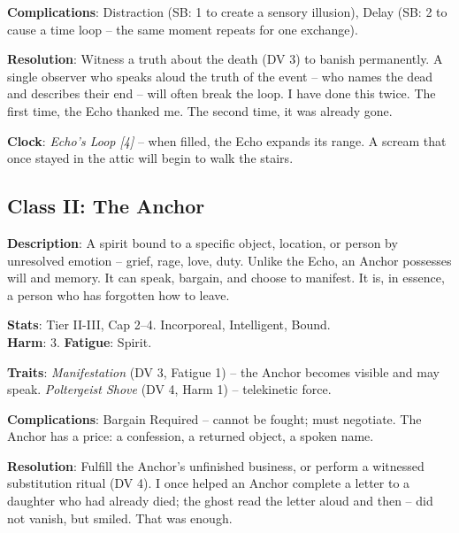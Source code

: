 \noindent\textbf{Complications}: Distraction (SB: 1 to create a sensory illusion), Delay (SB: 2 to cause a time loop -- the same moment repeats for one exchange).

\noindent\textbf{Resolution}: Witness a truth about the death (DV 3) to banish permanently. A single observer who speaks aloud the truth of the event -- who names the dead and describes their end -- will often break the loop. I have done this twice. The first time, the Echo thanked me. The second time, it was already gone.

\noindent\textbf{Clock}: \emph{Echo's Loop [4]} -- when filled, the Echo expands its range. A scream that once stayed in the attic will begin to walk the stairs.


\subsection*{Class II: The Anchor}

\noindent\textbf{Description}: A spirit bound to a specific object, location, or person by unresolved emotion -- grief, rage, love, duty. Unlike the Echo, an Anchor possesses will and memory. It can speak, bargain, and choose to manifest. It is, in essence, a person who has forgotten how to leave.


\noindent\textbf{Stats}: Tier II-III, Cap 2--4. Incorporeal, Intelligent, Bound.\\
\textbf{Harm}: 3. \textbf{Fatigue}: Spirit.

\noindent\textbf{Traits}: 
\emph{Manifestation} (DV 3, Fatigue 1) -- the Anchor becomes visible and may speak. \emph{Poltergeist Shove} (DV 4, Harm 1) -- telekinetic force.

\noindent\textbf{Complications}: Bargain Required -- cannot be fought; must negotiate. The Anchor has a price: a confession, a returned object, a spoken name.

\noindent\textbf{Resolution}: Fulfill the Anchor's unfinished business, or perform a witnessed substitution ritual (DV 4). I once helped an Anchor complete a letter to a daughter who had already died; the ghost read the letter aloud and then -- did not vanish, but smiled. That was enough.

